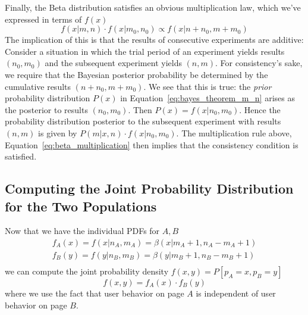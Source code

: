 \documentclass[letterpaper,12pt]{article}
\newcommand{\beq}{\begin{equation}} %
\newcommand{\eeq}{\end{equation}} %
\begin{document}
\begin{comment}
\item Since we've calculated the mean and the variance, we can
  approximate the Beta distribution by a normal distribution with
  the mean (Equation~\ref{eq:beta_mean}) and variance
  (Equation~\ref{eq:beta_variance}),
  {\it not} the mean and variance in Table~\ref{table:1Dstats}. In doing this
  approximation, one must be aware of the following differences
  \be
  \item the normal distribution has support outside the unit interval, 
  \item is finite at the bounds of the interval and 
  \item is symmetric about the mean, 
  \ee
\end{comment}

\item Finally, the Beta distribution satisfies an obvious
  multiplication law, which we've expressed in terms of \(f(x)\)
  \beq\label{eq:beta_multiplication} f(x|m,n)\cdot f(x|m_0,n_0)
  \propto f(x|n+n_0, m+m_0)
  \eeq
  The implication of this is that the results of consecutive
  experiments are additive: Consider a situation in which the trial
  period of an experiment yields results \((n_0,m_0)\) and the
  subsequent experiment yields \((n,m)\). For consistency's sake, we
  require that the Bayesian posterior probability be determined by the
  cumulative results \((n+n_0, m+m_0)\). We see that this is true: the
  {\em prior} probability distribution \(P(x)\) in
  Equation~\ref{eq:bayes_theorem_m_n} arises as the posterior to results
  \((n_0, m_0)\). Then \(P(x) = f(x|n_0, m_0)\). Hence the probability
  distribution posterior to the subsequent experiment with results
  \((n,m)\) is given by \(P(m|x,n)\cdot f(x|n_0,m_0)\). The
  multiplication rule above, Equation~\ref{eq:beta_multiplication}
  then implies that the consistency condition is satisfied.
\ei

\subsection{Computing the Joint Probability Distribution for the Two Populations}\label{sec:bayesian2D}
Now that we have the individual PDFs for \(A,B\)
\begin{equation}
\label{eq:fa_fb}
\begin{split}
f_A(x)=f(x|n_A,m_A) = \beta(x|m_A+1, n_A-m_A+1) \\
f_B(y)=f(y|n_B,m_B) = \beta(y|m_B+1, n_B-m_B+1) \\
\end{split}
\end{equation}
we can 
compute the joint probability density \(f(x, y) = P[p_A=x, p_B=y]\) 
\begin{equation}
\label{eqn_joint_pdf}
f(x,y) = f_A(x)\cdot f_B(y)
\end{equation}
where we use the fact that user behavior on page \(A\) is independent
of user behavior on page \(B\).
\end{document}
